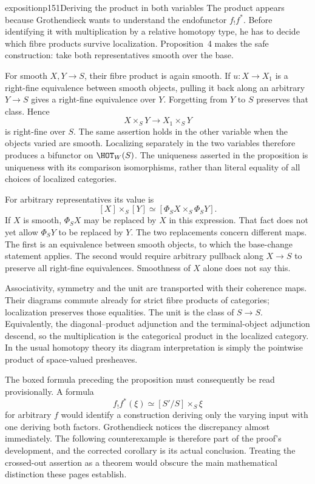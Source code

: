 \begin{dcomment}{exposition}{p151}{Deriving the product in both variables}
The product appears because Grothendieck wants to understand the endofunctor $f_!f^*$. Before identifying it with multiplication by a relative homotopy type, he has to decide which fibre products survive localization. Proposition~4 makes the safe construction: take both representatives smooth over the base.

For smooth $X,Y\longrightarrow S$, their fibre product is again smooth. If $u:X\longrightarrow X_1$ is a right-fine equivalence between smooth objects, pulling it back along an arbitrary $Y\longrightarrow S$ gives a right-fine equivalence over $Y$. Forgetting from $Y$ to $S$ preserves that class. Hence
\[
 X\times_SY\longrightarrow X_1\times_SY
\]
is right-fine over $S$. The same assertion holds in the other variable when the objects varied are smooth. Localizing separately in the two variables therefore produces a bifunctor on $\HOT_W(S)$. The uniqueness asserted in the proposition is uniqueness with its comparison isomorphisms, rather than literal equality of all choices of localized categories.

For arbitrary representatives its value is
\[
 [X]\times_S[Y]
 \simeq[\Phi_SX\times_S\Phi_SY].
\]
If $X$ is smooth, $\Phi_SX$ may be replaced by $X$ in this expression. That fact does not yet allow $\Phi_SY$ to be replaced by $Y$. The two replacements concern different maps. The first is an equivalence between smooth objects, to which the base-change statement applies. The second would require arbitrary pullback along $X\longrightarrow S$ to preserve all right-fine equivalences. Smoothness of $X$ alone does not say this.

Associativity, symmetry and the unit are transported with their coherence maps. Their diagrams commute already for strict fibre products of categories; localization preserves those equalities. The unit is the class of $S\longrightarrow S$. Equivalently, the diagonal--product adjunction and the terminal-object adjunction descend, so the multiplication is the categorical product in the localized category. In the usual homotopy theory its diagram interpretation is simply the pointwise product of space-valued presheaves.

The boxed formula preceding the proposition must consequently be read provisionally. A formula
\[
 f_!f^*(\xi)\simeq[S'/S]\times_S\xi
\]
for arbitrary $f$ would identify a construction deriving only the varying input with one deriving both factors. Grothendieck notices the discrepancy almost immediately. The following counterexample is therefore part of the proof's development, and the corrected corollary is its actual conclusion. Treating the crossed-out assertion as a theorem would obscure the main mathematical distinction these pages establish.
\end{dcomment}

